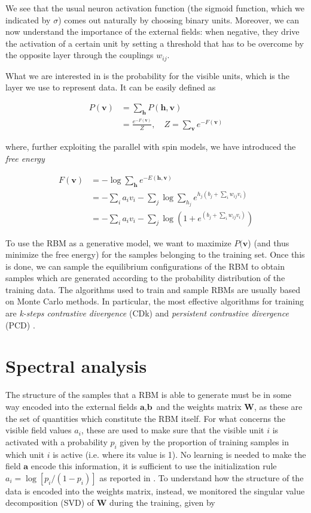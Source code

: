 \documentclass[twocolumn]{article}
\begin{document}
We see that the usual neuron activation function (the sigmoid function, which we indicated by \(\sigma\)) comes out naturally by choosing binary units. Moreover, we can now understand the importance of the external fields: when negative, they drive the activation of a certain unit by setting a threshold that has to be overcome by the opposite layer through the couplings \(w_{ij}\).

What we are interested in is the probability for the visible units, which is the layer we use to represent data. It can be easily defined as

\begin{align}
P(\textbf{v}) &  = \sum_{\textbf{h}} P(\textbf{h},\textbf{v}) \nonumber \\
& = \frac{e^{-F(\textbf{v})}}{Z}, \quad Z = \sum_{\textbf{v}} e^{-F(\textbf{v})}
\end{align}

where, further exploiting the parallel with spin models, we have introduced the \textit{free energy}

\begin{align}
F(\textbf{v}) & = -\log \sum_{\textbf{h}} e^{-E(\textbf{h},\textbf{v})} \nonumber \\
& = -\sum_i a_i v_i -\sum_j \log \sum_{h_j} e^{h_j \left( b_j + \sum_i w_{ij} v_i \right)} \nonumber \\
& = -\sum_i a_i v_i -\sum_j \log \left( 1 +  e^{\left( b_j + \sum_i w_{ij} v_i \right)} \right)
\end{align}

To use the RBM as a generative model, we want to maximize \(P(\textbf{v}\)) (and thus minimize the free energy) for the samples belonging to the training set. Once this is done, we can sample the equilibrium configurations of the RBM to obtain samples which are generated according to the probability distribution of the training data. The algorithms used to train and sample RBMs are usually based on Monte Carlo methods. In particular, the most effective algorithms for training are \textit{k-steps contrastive divergence} (CDk) \cite{Hinton_CD}  and \textit{persistent contrastive divergence} (PCD) \cite{PCD}. 

\section{Spectral analysis}
The structure of the samples that a RBM  is able to generate must be in some way encoded into the external fields \(\textbf{a},\textbf{b}\) and the weights matrix \(\textbf{W}\), as these are the set of quantities which constitute the RBM itself. For what concerns the visible field values \(a_i\), these are used to make sure that the visible unit \(i\) is activated with a probability \(p_i\) given by the proportion of training samples in which unit \(i\) is active (i.e. where its value is 1). No learning is needed to make the field \(\textbf{a}\) encode this information, it is sufficient to use the initialization rule \(a_i = \log[p_i/(1-p_i)]\) as reported in \cite{Hinton_guide}. To understand how the structure of the data is encoded into the weights matrix, instead, we monitored the singular value decomposition (SVD) of \textbf{W} during the training, given by
\end{document}
